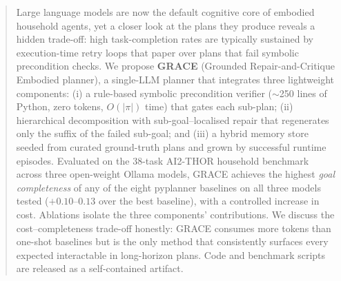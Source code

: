 
\begin{abstract}
Large language models are now the default cognitive core of embodied
household agents, yet a closer look at the plans they produce reveals
a hidden trade-off: high task-completion rates are typically sustained
by execution-time retry loops that paper over plans that fail
symbolic precondition checks. We propose \textbf{GRACE} (Grounded
Repair-and-Critique Embodied planner), a single-LLM planner that
integrates three lightweight components: (i) a rule-based symbolic
precondition verifier ($\sim$250 lines of Python, zero tokens,
$O(|\pi|)$ time) that gates each sub-plan; (ii) hierarchical
decomposition with sub-goal--localised repair that regenerates only
the suffix of the failed sub-goal; and (iii) a hybrid memory store
seeded from curated ground-truth plans and grown by successful
runtime episodes. Evaluated on the 38-task AI2-THOR household
benchmark across three open-weight Ollama models, GRACE achieves the
highest \emph{goal completeness} of any of the eight pyplanner
baselines on all three models tested ($+0.10$--$0.13$ over the best
baseline), with a controlled increase in cost. Ablations isolate the
three components' contributions. We discuss the cost--completeness
trade-off honestly: GRACE consumes more tokens than one-shot
baselines but is the only method that consistently surfaces every
expected interactable in long-horizon plans. Code and benchmark
scripts are released as a self-contained artifact.
\end{abstract}
